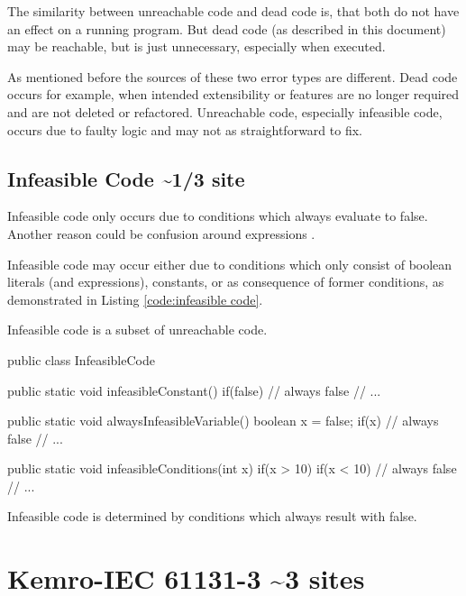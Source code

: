 The similarity between unreachable code and dead code is, that both do not have an effect on a running program. But dead code (as described in this document) may be reachable, but is just unnecessary, especially when executed. 


As mentioned before the sources of these two error types are different.
Dead code occurs for example, when intended extensibility or features are no longer required and are not deleted or refactored.
Unreachable code, especially infeasible code, occurs due to faulty logic and may not as straightforward to fix.
\subsection{Infeasible Code \textasciitilde 1/3 site}
\label{sub:infeasible code}

Infeasible code only occurs due to conditions which always evaluate to false. Another reason could be confusion around expressions \cite{Eichberg_2015}.


Infeasible code may occur either due to conditions which only consist of boolean literals (and expressions), constants, or as consequence of former conditions, as demonstrated in Listing \ref{code:infeasible code}.

Infeasible code is a subset of unreachable code.
\begin{program}
	\begin{JavaCode}
public class InfeasibleCode {
	public static void infeasibleConstant() {
		if(false) {
			// always false
			// ...
		}
	}
			
	public static void alwaysInfeasibleVariable() {
		boolean x = false;
		if(x) {
			// always false
			// ...
		}
	}
			
	public static void infeasibleConditions(int x) {
		if(x > 10) {
			if(x < 10) {
				// always false
				// ...
			}
		}
	}
}\end{JavaCode}
	\caption{Infeasible code is determined by conditions which always result with false. }
	\label{code:infeasible code}
\end{program}




\section{Kemro-IEC 61131-3 \textasciitilde 3 sites}
\label{sec:iec}
% 
 
